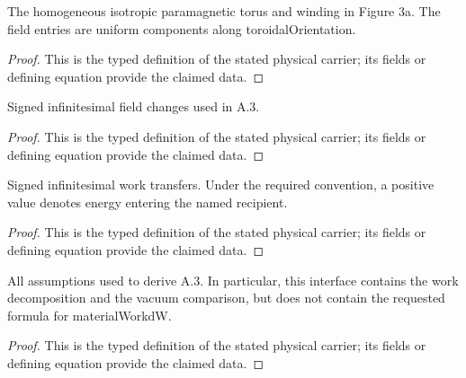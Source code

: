 \begin{definition}
  \label{def:physics:IPhO_2026_3_A_3:aux016}
  The homogeneous isotropic paramagnetic torus and winding in Figure 3a. The field entries are uniform components along toroidalOrientation.
\end{definition}
\begin{proof}
  This is the typed definition of the stated physical carrier; its fields or defining equation provide the claimed data.
\end{proof}

\begin{definition}
  \label{def:physics:IPhO_2026_3_A_3:aux017}
  Signed infinitesimal field changes used in A.3.
\end{definition}
\begin{proof}
  This is the typed definition of the stated physical carrier; its fields or defining equation provide the claimed data.
\end{proof}

\begin{definition}
  \label{def:physics:IPhO_2026_3_A_3:aux018}
  Signed infinitesimal work transfers. Under the required convention, a positive value denotes energy entering the named recipient.
\end{definition}
\begin{proof}
  This is the typed definition of the stated physical carrier; its fields or defining equation provide the claimed data.
\end{proof}

\begin{definition}
  \label{def:physics:IPhO_2026_3_A_3:aux019}
  All assumptions used to derive A.3. In particular, this interface contains the work decomposition and the vacuum comparison, but does not contain the requested formula for materialWorkdW.
\end{definition}
\begin{proof}
  This is the typed definition of the stated physical carrier; its fields or defining equation provide the claimed data.
\end{proof}

